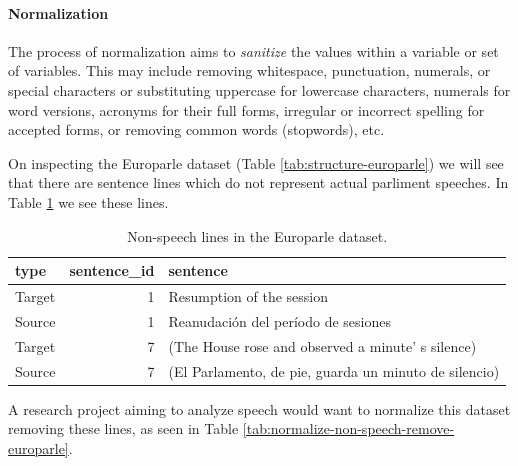 \documentclass[
]{article}
\begin{document}
\hypertarget{normalization}{%
\paragraph{Normalization}\label{normalization}}

The process of normalization aims to \emph{sanitize} the values within a variable or set of variables. This may include removing whitespace, punctuation, numerals, or special characters or substituting uppercase for lowercase characters, numerals for word versions, acronyms for their full forms, irregular or incorrect spelling for accepted forms, or removing common words (stopwords), etc.

On inspecting the Europarle dataset (Table \ref{tab:structure-europarle}) we will see that there are sentence lines which do not represent actual parliment speeches. In Table \ref{tab:normalize-non-speech-identify-europarle} we see these lines.

\begin{table}

\caption{\label{tab:normalize-non-speech-identify-europarle}Non-speech lines in the Europarle dataset.}
\centering
\begin{tabular}[t]{lrl}
\toprule
type & sentence\_id & sentence\\
\midrule
Target & 1 & Resumption of the session\\
Source & 1 & Reanudación del período de sesiones\\
Target & 7 & (The House rose and observed a minute' s silence)\\
Source & 7 & (El Parlamento, de pie, guarda un minuto de silencio)\\
\bottomrule
\end{tabular}
\end{table}

A research project aiming to analyze speech would want to normalize this dataset removing these lines, as seen in Table \ref{tab:normalize-non-speech-remove-europarle}.
\end{document}

